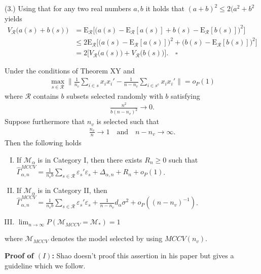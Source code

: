\documentclass[Research_Module_ES.tex]{subfiles}
\begin{document}
(3.) Using that for any two real numbers $a,b$ it holds that $(a+b)^2\le 2(a^2+b^2$ yields
\begin{align*}
V_\mathcal{R}\bigl(a(s)+b(s)\bigr) 
&= \mathrm{E}_\mathcal{R}\bigl[\bigl(a(s)-\mathrm{E}_\mathcal{R}[a(s)] + b(s) - \mathrm{E}_\mathcal{R}[b(s)]\bigr)^2\bigr]\\
&\le 2 \mathrm{E}_\mathcal{R}\bigl[\bigl(a(s)-\mathrm{E}_\mathcal{R}[a(s)] \bigr)^2+\bigl(b(s) - \mathrm{E}_\mathcal{R}[b(s)]\bigr)^2\bigr]\\
&= 2\bigl[V_\mathcal{R}\bigl(a(s)\bigr)+V_\mathcal{R}\bigl(b(s)\bigr)\bigr]. \quad \square
\end{align*}


\begin{satz}
Under the conditions of Theorem XY and
\begin{align*}
\max_{s\in \mathcal{R}}\biggl\lVert \frac{1}{n_v}\sum_{i\in s}x_ix_i' - \frac{1}{n-n_v}\sum_{i\in s^c}x_ix_i'\biggr\rVert =o_P(1)
\end{align*}
where $\mathcal{R}$ contains $b$ subsets selected randomly with $b$ satisfying
\begin{align*}
\frac{n^2}{b(n-n_v)^2}\to 0.
\end{align*}
Suppose furthermore that $n_v$ is selected such that
\begin{align*}
\frac{n_v}{n}\to 1 \quad \textrm{and} \quad n-n_v \to \infty.
\end{align*}
Then the following holds
\begin{enumerate}[(I)]
\item If $\mathcal{M}_\alpha$ is in Category I, then there exists $R_n \ge 0$ such that $\hat{\Gamma}_{\alpha,n}^{MCCV} = \frac{1}{n_vb}\sum_{s\in \mathcal{R}}\varepsilon_s'\varepsilon_s + \Delta_{\alpha,n} + R_n + o_P(1)$.
\item If $\mathcal{M}_\alpha$ is in Category II, then $\hat{\Gamma}_{\alpha,n}^{MCCV} = \frac{1}{n_vb}\sum_{s\in \mathcal{R}}\varepsilon_s'\varepsilon_s + \frac{1}{n-n_v}d_\alpha\sigma^2  + o_P((n-n_v)^{-1})$.
\item $\lim_{n\to\infty}P(\mathcal{M}_{MCCV}=\mathcal{M}_\ast) = 1$
\end{enumerate}
where $\mathcal{M}_{MCCV}$ denotes the model selected by using $MCCV(n_v)$.
\end{satz}

\textbf{Proof of $(I)$:} 
Shao doesn't proof this assertion in his paper but gives a guideline which we follow.
\end{document}
